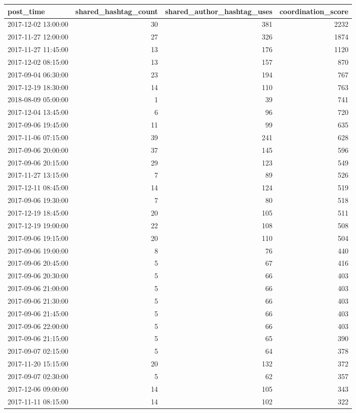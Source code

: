 \begin{tabular}{lrrr}
\toprule
post\_time & shared\_hashtag\_count & shared\_author\_hashtag\_uses & coordination\_score \\
\midrule
2017-12-02 13:00:00 & 30 & 381 & 2232 \\
2017-11-27 12:00:00 & 27 & 326 & 1874 \\
2017-11-27 11:45:00 & 13 & 176 & 1120 \\
2017-12-02 08:15:00 & 13 & 157 & 870 \\
2017-09-04 06:30:00 & 23 & 194 & 767 \\
2017-12-19 18:30:00 & 14 & 110 & 763 \\
2018-08-09 05:00:00 & 1 & 39 & 741 \\
2017-12-04 13:45:00 & 6 & 96 & 720 \\
2017-09-06 19:45:00 & 11 & 99 & 635 \\
2017-11-06 07:15:00 & 39 & 241 & 628 \\
2017-09-06 20:00:00 & 37 & 145 & 596 \\
2017-09-06 20:15:00 & 29 & 123 & 549 \\
2017-11-27 13:15:00 & 7 & 89 & 526 \\
2017-12-11 08:45:00 & 14 & 124 & 519 \\
2017-09-06 19:30:00 & 7 & 80 & 518 \\
2017-12-19 18:45:00 & 20 & 105 & 511 \\
2017-12-19 19:00:00 & 22 & 108 & 508 \\
2017-09-06 19:15:00 & 20 & 110 & 504 \\
2017-09-06 19:00:00 & 8 & 76 & 440 \\
2017-09-06 20:45:00 & 5 & 67 & 416 \\
2017-09-06 20:30:00 & 5 & 66 & 403 \\
2017-09-06 21:00:00 & 5 & 66 & 403 \\
2017-09-06 21:30:00 & 5 & 66 & 403 \\
2017-09-06 21:45:00 & 5 & 66 & 403 \\
2017-09-06 22:00:00 & 5 & 66 & 403 \\
2017-09-06 21:15:00 & 5 & 65 & 390 \\
2017-09-07 02:15:00 & 5 & 64 & 378 \\
2017-11-20 15:15:00 & 20 & 132 & 372 \\
2017-09-07 02:30:00 & 5 & 62 & 357 \\
2017-12-06 09:00:00 & 14 & 105 & 343 \\
2017-11-11 08:15:00 & 14 & 102 & 322 \\

\end{tabular}
